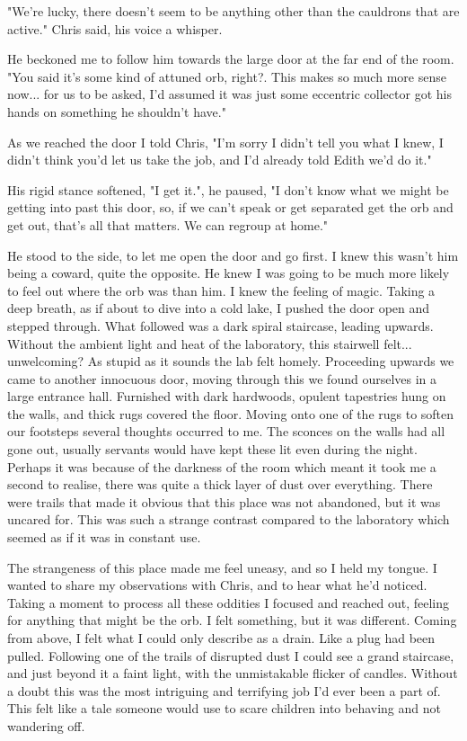 \begin{dialogue}
    \item{"We're lucky, there doesn't seem to be anything other than the cauldrons that are active." Chris said, his voice a whisper.}
    \item {He beckoned me to follow him towards the large door at the far end of the room. "You said it's some kind of attuned orb, right?. This makes so much more sense now... for us to be asked, I'd assumed it was just some eccentric collector got his hands on something he shouldn't have."}
    \item {As we reached the door I told Chris, "I'm sorry I didn't tell you what I knew, I didn't think you'd let us take the job, and I'd already told Edith we'd do it."}
    \item {His rigid stance softened, "I get it.", he paused, "I don't know what we might be getting into past this door, so, if we can't speak or get separated get the orb and get out, that's all that matters. We can regroup at home."}
\end{dialogue}

He stood to the side, to let me open the door and go first. I knew this wasn't
him being a coward, quite the opposite. He knew I was going to be much more
likely to feel out where the orb was than him. I knew the feeling of magic.
Taking a deep breath, as if about to dive into a cold lake, I pushed the door
open and stepped through. What followed was a dark spiral staircase, leading
upwards. Without the ambient light and heat of the laboratory, this stairwell
felt... unwelcoming? As stupid as it sounds the lab felt homely. Proceeding
upwards we came to another innocuous door, moving through this we found ourselves
in a large entrance hall. Furnished with dark hardwoods, opulent tapestries hung
on the walls, and thick rugs covered the floor. Moving onto one of the rugs to
soften our footsteps several thoughts occurred to me. The sconces on the walls
had all gone out, usually servants would have kept these lit even during the
night. Perhaps it was because of the darkness of the room which meant it took me
a second to realise, there was quite a thick layer of dust over everything.
There were trails that made it obvious that this place was not abandoned, but it
was uncared for. This was such a strange contrast compared to the laboratory
which seemed as if it was in constant use. 

The strangeness of this place made me feel uneasy, and so I held my tongue. I
wanted to share my observations with Chris, and to hear what he'd noticed. Taking
a moment to process all these oddities I focused and reached out, feeling for
anything that might be the orb. I felt something, but it was different. Coming
from above, I felt what I could only describe as a drain. Like a plug had been
pulled. Following one of the trails of disrupted dust I could see a grand
staircase, and just beyond it a faint light, with the unmistakable flicker of
candles. Without a doubt this was the most intriguing and terrifying job I'd
ever been a part of. This felt like a tale someone would use to scare children
into behaving and not wandering off.


